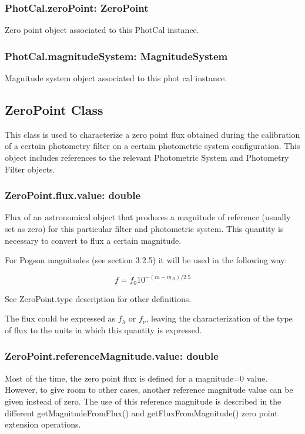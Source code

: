 \documentclass[11pt,a4paper]{ivoa}
\begin{document}
\subsubsection{PhotCal.zeroPoint: ZeroPoint}
Zero point object associated to this PhotCal instance.
\par

\subsubsection{PhotCal.magnitudeSystem: MagnitudeSystem}
Magnitude system object associated to this phot cal instance.
\par

\subsection{ZeroPoint Class}
This class is used to characterize a zero point flux obtained during the calibration of a certain photometry filter on a certain photometric system configuration. This object includes references to the relevant Photometric System and Photometry Filter objects.
\par

\subsubsection{ZeroPoint.flux.value: double}
Flux of an astronomical object that produces a magnitude of reference (usually set as zero) for this particular filter and photometric system. This quantity is necessary to convert to flux a certain magnitude.
\par

For Pogson magnitudes (see section 3.2.5) it will be used in the following way:
\par
\[
f = f_0 10^{-(m-m_R )/2.5}
\]

See ZeroPoint.type description for other definitions.
\par

The flux could be expressed as $f_{\lambda}$ or $f_{\nu}$, leaving the characterization of the type of flux to the units in which this quantity is expressed.
\par

\subsubsection{ZeroPoint.referenceMagnitude.value: double}
Most of the time, the zero point flux is defined for a magnitude=0 value. However, to give room to other cases, another reference magnitude value can be given instead of zero. The use of this reference magnitude is described in the different getMagnitudeFromFlux() and getFluxFromMagnitude() zero point extension operations.
\par
\end{document}
